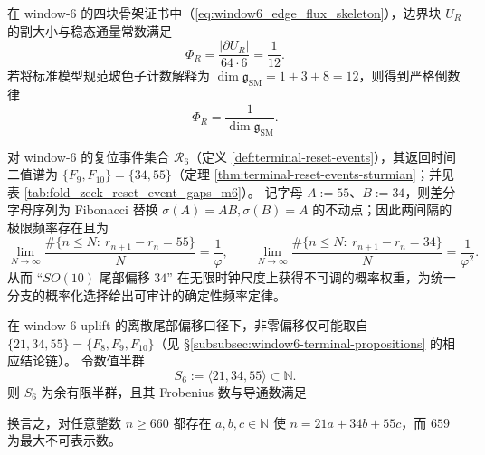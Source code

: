 \begin{corollary}\label{cor:xi-window6-reciprocal-flux-boson12}
在 window-\(6\) 的四块骨架证书中（\eqref{eq:window6_edge_flux_skeleton}），边界块 \(U_R\) 的割大小与稳态通量常数满足
\[
\Phi_R=\frac{|\partial U_R|}{64\cdot 6}=\frac{1}{12}.
\]
若将标准模型规范玻色子计数解释为 \(\dim\mathfrak g_{\mathrm{SM}}=1+3+8=12\)，则得到严格倒数律
\[
\Phi_R=\frac{1}{\dim\mathfrak g_{\mathrm{SM}}}.
\]
\end{corollary}

\begin{corollary}\label{cor:xi-window6-reset-clock-gap-frequencies}
对 window-\(6\) 的复位事件集合 \(\mathcal R_6\)（定义 \ref{def:terminal-reset-events}），其返回时间二值谱为
\(\{F_9,F_{10}\}=\{34,55\}\)（定理 \ref{thm:terminal-reset-events-sturmian}；并见表 \ref{tab:fold_zeck_reset_event_gaps_m6}）。
记字母 \(A:=55\)、\(B:=34\)，则差分字母序列为 Fibonacci 替换 \(\sigma(A)=AB,\sigma(B)=A\) 的不动点；因此两间隔的极限频率存在且为
\[
\lim_{N\to\infty}\frac{\#\{n\le N:\ r_{n+1}-r_n=55\}}{N}=\frac{1}{\varphi},
\qquad
\lim_{N\to\infty}\frac{\#\{n\le N:\ r_{n+1}-r_n=34\}}{N}=\frac{1}{\varphi^2}.
\]
从而 “\(SO(10)\) 尾部偏移 \(34\)” 在无限时钟尺度上获得不可调的概率权重，为统一分支的概率化选择给出可审计的确定性频率定律。
\end{corollary}

\begin{theorem}\label{thm:xi-window6-tail-semigroup-frobenius-threshold}
在 window-\(6\) uplift 的离散尾部偏移口径下，非零偏移仅可能取自
\(\{21,34,55\}=\{F_8,F_9,F_{10}\}\)（见 \S\ref{subsubsec:window6-terminal-propositions} 的相应结论链）。
令数值半群
\[
S_6:=\langle 21,34,55\rangle\subset\mathbb N.
\]
则 \(S_6\) 为余有限半群，且其 Frobenius 数与导通数满足

换言之，对任意整数 \(n\ge 660\) 都存在 \(a,b,c\in\mathbb N\) 使
\(
n=21a+34b+55c
\)，而 \(659\) 为最大不可表示数。
\end{theorem}

